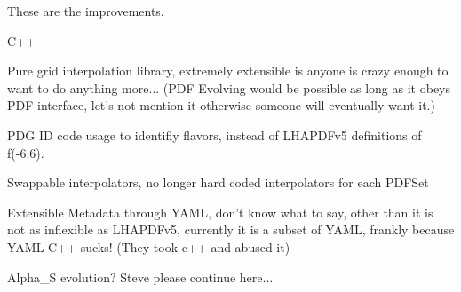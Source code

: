 These are the improvements.

C++

Pure grid interpolation library, extremely extensible is anyone is 
crazy enough to want to do anything more... (PDF Evolving would be 
possible as long as it obeys PDF interface, let's not mention it 
otherwise someone will eventually want it.)

PDG ID code usage to identifiy flavors, instead of LHAPDFv5 
definitions of f(-6:6).

Swappable interpolators, no longer hard coded interpolators for each 
PDFSet

Extensible Metadata through YAML, don't know what to say, other than it 
is not as inflexible as LHAPDFv5, currently it is a subset of YAML, 
frankly because YAML-C++ sucks! (They took c++ and abused it)

Alpha_S evolution? Steve please continue here...

